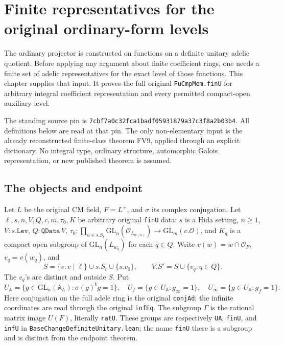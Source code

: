\section{Finite representatives for the original ordinary-form levels}
\label{sec:finite-levels-v42}

The ordinary projector is constructed on functions on a definite unitary
adelic quotient.  Before applying any argument about finite coefficient
rings, one needs a finite set of adelic representatives for the exact level
of those functions.  This chapter supplies that input.  It proves the full
original \texttt{FuCmpMem.finU} for arbitrary integral coefficient
representation and every permitted compact-open auxiliary level.

The standing source pin is
\texttt{7cbf7a0c32fca1badf05931879a37c3f8a2b03b4}.
All definitions below are read at that pin.  The only non-elementary input
is the already reconstructed finite-class theorem FV9, applied through an
explicit dictionary.  No integral type, ordinary structure, automorphic
Galois representation, or new published theorem is assumed.

\subsection{The objects and endpoint}

Let \(L\) be the original CM field, \(F=L^+\), and \(\sigma\) its complex
conjugation.  Let \(\ell,s,n,V,Q,c,m,\tau _0,K\) be arbitrary original
\texttt{finU} data: \(s\) is a Hida setting, \(n\ge1\),
\(V:s.\texttt{Lev}\), \(Q:\texttt{QData}\,V\),
\(\tau _0:\prod_{u\in s.S_t}\mathrm{GL}_n(\mathcal O_{L_{w(u)}})
\to\mathrm{GL}_m(c.\mathcal O)\), and \(K_q\) is a compact open
subgroup of \(\mathrm{GL}_n(L_{w_q})\) for each \(q\in Q\).
Write \(v(w)=w\cap\mathcal O_F\), \(v_q=v(w_q)\), and
\[
 S=\{v:v\mid\ell\}\cup s.S_t\cup\{s.v_0\},\qquad
 V.S'=S\cup\{v_q:q\in Q\}.
\]
The \(v_q\)'s are distinct and outside \(S\).  Put
\[
 U_{\mathbb A}=\{g\in\mathrm{GL}_n(\mathbb A_L):
                  \sigma(g)^{\mathsf t}g=1\},\quad
 U_f=\{g\in U_{\mathbb A}:g_\infty=1\},\quad
 U_\infty=\{g\in U_{\mathbb A}:g_f=1\}.
\]
Here conjugation on the full adele ring is the original
\texttt{conjAd}; the infinite coordinates are read through the original
\texttt{infEq}.  The subgroup \(\Gamma\) is the rational matrix image
\(U(F)\), literally \texttt{ratU}.  These groups are respectively
\texttt{UA}, \texttt{finU}, and \texttt{infU} in
\texttt{BaseChangeDefiniteUnitary.lean}; the name \texttt{finU} there
is a subgroup and is distinct from the endpoint theorem.

